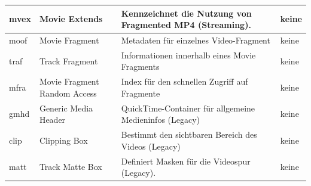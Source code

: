 \begin{table}[h]
\begin{tabular}{|l|p{2.5cm}|p{5.5cm}|p{5.5cm}|}
 mvex& Movie Extends&Kennzeichnet die Nutzung von Fragmented MP4 (Streaming).& keine\\\hline
 moof& Movie Fragment&Metadaten für einzelnes Video-Fragment& keine\\\hline
 traf& Track Fragment&Informationen innerhalb eines Movie Fragments& keine\\\hline
 mfra& Movie Fragment Random Access&Index für den schnellen Zugriff auf Fragmente& keine\\\hline
 gmhd& Generic Media Header&QuickTime-Container für allgemeine Medieninfos (Legacy)& keine\\\hline
 clip& Clipping Box&Bestimmt den sichtbaren Bereich des Videos (Legacy)& keine\\\hline
 matt& Track Matte Box&Definiert Masken für die Videospur (Legacy).& keine\\ \hline
    \end{tabular}
\end{table}